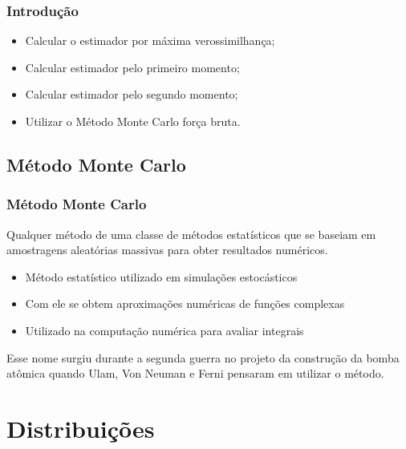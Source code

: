 \documentclass[12pt]{beamer}
\begin{document}
\begin{frame}
\frametitle{Introdução}
\begin{itemize}
\item Calcular o estimador por máxima verossimilhança;

\bigskip

\item Calcular estimador pelo primeiro momento;

\bigskip

\item Calcular estimador pelo segundo momento;

\bigskip

\item Utilizar o Método Monte Carlo força bruta.

\end{itemize}
\end{frame}

\subsection{Método Monte Carlo}
\begin{frame}
  \frametitle{Método Monte Carlo} 
  Qualquer método de uma classe de métodos estatísticos que se baseiam em amostragens aleatórias massivas para obter resultados numéricos. 
  \begin{itemize}
  \item M\'etodo estat\'istico utilizado em simulaç\~oes estoc\'asticos
  \item Com ele se obtem aproximaç\~oes numéricas de funções complexas
  \item Utilizado na computação numérica para avaliar integrais
  \end{itemize}
  Esse nome surgiu durante a segunda guerra no projeto da construção da bomba atômica quando Ulam, Von Neuman e Ferni pensaram em utilizar o método.
\end{frame}

\section{Distribuições}







\end{document}
